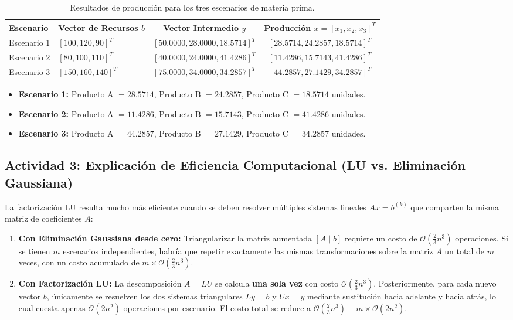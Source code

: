 \documentclass[11pt,a4paper]{article}
\begin{document}
\begin{table}[h!]
    \centering
    \caption{Resultados de producción para los tres escenarios de materia prima.}
    \begin{tabular}{llcc}
        \toprule
        \textbf{Escenario} & \textbf{Vector de Recursos $b$} & \textbf{Vector Intermedio $y$} & \textbf{Producción $x = [x_1, x_2, x_3]^T$} \\
        \midrule
        Escenario 1 & $[100, 120, 90]^T$ & $[50.0000, 28.0000, 18.5714]^T$ & $[28.5714, 24.2857, 18.5714]^T$ \\
        Escenario 2 & $[80, 100, 110]^T$ & $[40.0000, 24.0000, 41.4286]^T$ & $[11.4286, 15.7143, 41.4286]^T$ \\
        Escenario 3 & $[150, 160, 140]^T$ & $[75.0000, 34.0000, 34.2857]^T$ & $[44.2857, 27.1429, 34.2857]^T$ \\
        \bottomrule
    \end{tabular}
\end{table}

\begin{itemize}[leftmargin=*]
    \item \textbf{Escenario 1:} Producto A $= 28.5714$, Producto B $= 24.2857$, Producto C $= 18.5714$ unidades.
    \item \textbf{Escenario 2:} Producto A $= 11.4286$, Producto B $= 15.7143$, Producto C $= 41.4286$ unidades.
    \item \textbf{Escenario 3:} Producto A $= 44.2857$, Producto B $= 27.1429$, Producto C $= 34.2857$ unidades.
\end{itemize}

\subsection{Actividad 3: Explicación de Eficiencia Computacional (LU vs. Eliminación Gaussiana)}
La factorización LU resulta mucho más eficiente cuando se deben resolver múltiples sistemas lineales $Ax = b^{(k)}$ que comparten la misma matriz de coeficientes $A$:
\begin{enumerate}[leftmargin=*]
    \item \textbf{Con Eliminación Gaussiana desde cero:} Triangularizar la matriz aumentada $[A \mid b]$ requiere un costo de $\mathcal{O}\left(\frac{2}{3}n^3\right)$ operaciones. Si se tienen $m$ escenarios independientes, habría que repetir exactamente las mismas transformaciones sobre la matriz $A$ un total de $m$ veces, con un costo acumulado de $m \times \mathcal{O}\left(\frac{2}{3}n^3\right)$.
    \item \textbf{Con Factorización LU:} La descomposición $A = LU$ se calcula \textbf{una sola vez} con costo $\mathcal{O}\left(\frac{2}{3}n^3\right)$. Posteriormente, para cada nuevo vector $b$, únicamente se resuelven los dos sistemas triangulares $Ly = b$ y $Ux = y$ mediante sustitución hacia adelante y hacia atrás, lo cual cuesta apenas $\mathcal{O}(2n^2)$ operaciones por escenario. El costo total se reduce a $\mathcal{O}\left(\frac{2}{3}n^3\right) + m \times \mathcal{O}(2n^2)$.
\end{enumerate}
\end{document}
